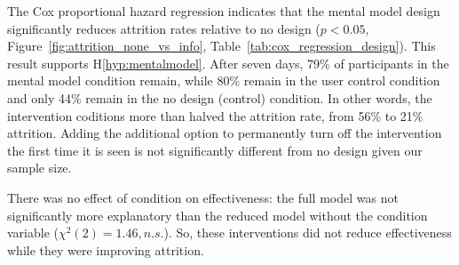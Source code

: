 The Cox proportional hazard regression indicates that the mental model design  significantly reduces attrition rates relative to no design ($p < 0.05$, Figure~\ref{fig:attrition_none_vs_info}, Table~\ref{tab:cox_regression_design}). This result supports H\ref*{hyp:mentalmodel}. %
After seven days, 79\% of participants in the mental model condition remain, while 80\% remain in the user control condition and only 44\% remain in the no design (control) condition. In other words, the intervention coditions more than halved the attrition rate, from 56\% to 21\% attrition. Adding the additional option to permanently turn off the intervention the first time it is seen is not significantly different from no design given our sample size. %

There was no effect of condition on effectiveness: the full model was not significantly more explanatory than the reduced model without the condition variable ($\chi^{2}(2) = 1.46, n.s.$). So, these interventions did not reduce effectiveness while they were improving attrition. %




